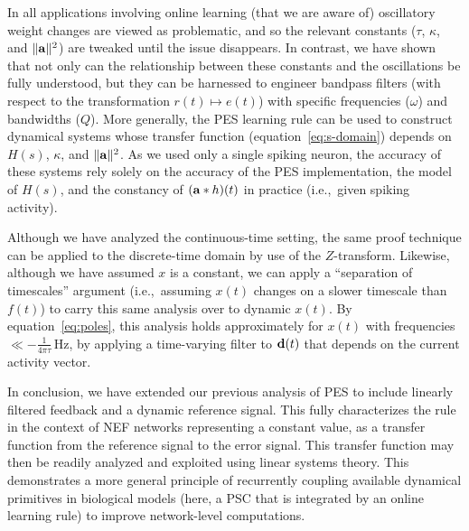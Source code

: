 In all applications involving online learning (that we are aware of) oscillatory weight changes are viewed as problematic, and so the relevant constants ($\tau$, $\kappa$, and $\| \mathbf{a} \|^2$) are tweaked until the issue disappears.
In contrast, we have shown that not only can the relationship between these constants and the oscillations be fully understood, but they can be harnessed to engineer bandpass filters (with respect to the transformation $r(t) \mapsto e(t)$) with specific frequencies ($\omega$) and bandwidths ($Q$).
More generally, the PES learning rule can be used to construct dynamical systems whose transfer function (equation~\ref{eq:s-domain}) depends on $H(s)$, $\kappa$, and $\| \mathbf{a} \|^2$.
As we used only a single spiking neuron, the accuracy of these systems rely solely on the accuracy of the PES implementation, the model of $H(s)$, and the constancy of $(\mathbf{a} \ast h)(t)$ in practice (i.e.,~given spiking activity).

Although we have analyzed the continuous-time setting, the same proof technique can be applied to the discrete-time domain by use of the $Z$-transform.
Likewise, although we have assumed $x$ is a constant, we can apply a ``separation of timescales'' argument (i.e.,~assuming $x(t)$ changes on a slower timescale than $f(t)$) to carry this same analysis over to dynamic $x(t)$.
By equation~\ref{eq:poles}, this analysis holds approximately for $x(t)$ with frequencies $\ll -\frac{1}{4 \pi \tau}\,$Hz, by applying a time-varying filter to $\mathbf{d}(t)$ that depends on the current activity vector.

In conclusion, we have extended our previous analysis of PES to include linearly filtered feedback and a dynamic reference signal.
This fully characterizes the rule in the context of NEF networks representing a constant value, as a transfer function from the reference signal to the error signal.
This transfer function may then be readily analyzed and exploited using linear systems theory.
This demonstrates a more general principle of recurrently coupling available dynamical primitives in biological models (here, a PSC that is integrated by an online learning rule) to improve network-level computations.

